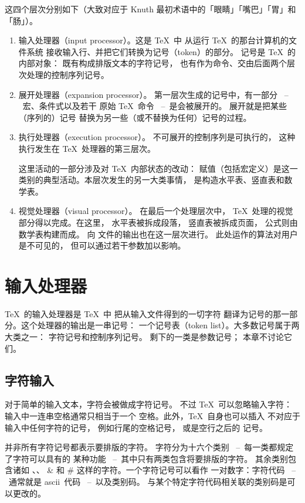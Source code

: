 \documentclass[a4paper]{rapport3}
\def\ldash{\unskip\ --\nobreak\ \ignorespaces}
\def\rdash{\unskip\nobreak\ --\ \ignorespaces}
\def\ascii{{\sc ascii}}
\begin{document}
这四个层次分别如下（大致对应于
Knuth 最初术语中的「眼睛」「嘴巴」「胃」和「肠」）。
\begin{enumerate}\item
输入处理器（input processor）。这是 \TeX\ 中
从运行 \TeX\ 的那台计算机的文件系统
接收输入行、并把它们转换为记号（token）的部分。
记号是 \TeX\ 的内部对象：
既有构成排版文本的字符记号，
也有作为命令、交由后面两个层次处理的控制序列记号。
\item 展开处理器（expansion processor）。
第一层次生成的记号中，有一部分 \ldash 宏、条件式以及若干
原始 \TeX\ 命令 \rdash 是会被展开的。
展开就是把某些（序列的）记号
替换为另一些（或不替换为任何）记号的过程。
\item 执行处理器（execution processor）。
不可展开的控制序列是可执行的，
这种执行发生在 \TeX\ 处理器的第三层次。

这里活动的一部分涉及对 \TeX\ 内部状态的改动：
赋值（包括宏定义）是这一
\awp
类别的典型活动。本层次发生的另一大类事情，
是构造水平表、竖直表和数学表。
\item 视觉处理器（visual processor）。
在最后一个处理层次中，
\TeX\ 处理的视觉部分得以完成。在这里，
水平表被拆成段落，
竖直表被拆成页面，
公式则由数学表构建而成。
向  文件的输出也在这一层次进行。
此处运作的算法对用户是不可见的，
但可以通过若干参数加以影响。
\end{enumerate}

\section{输入处理器}

\TeX\ 的输入处理器是 \TeX\ 中
把从输入文件得到的一切字符
翻译为记号的那一部分。这个处理器的输出是一串记号：
一个记号表（token list）。大多数记号属于两大类之一：
字符记号和控制序列记号。
剩下的一类是参数记号；
本章不讨论它们。

\subsection{字符输入}

对于简单的输入文本，字符会被做成字符记号。
不过 \TeX\ 可以忽略输入字符：
输入中一连串空格通常只相当于一个
空格。此外，\TeX\ 自身也可以插入
不对应于输入中任何字符的记号，
例如行尾的空格记号，
或是空行之后的  记号。

并非所有字符记号都表示要排版的字符。
\altt
字符分为十六个类别 \ldash 每一类都规定了字符可以具有的
某种功能 \rdash 其中只有两类包含将要排版的字符。
其余类别包含诸如 、、
\n\& 和 \n\# 这样的字符。一个字符记号可以看作
一对数字：字符代码 \ldash 通常就是 \ascii\
代码 \rdash 以及类别码。
与某个特定字符代码相关联的类别码是可以更改的。
\end{document}
